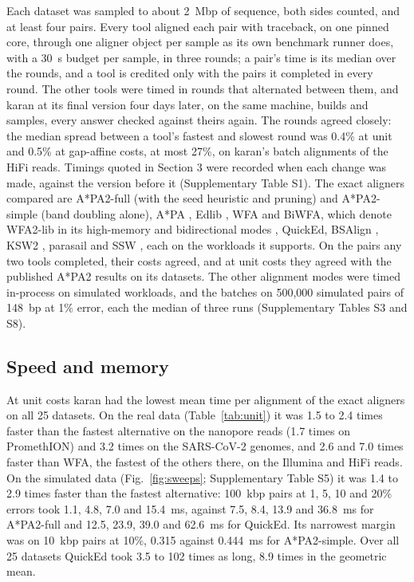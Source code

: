 Each dataset was sampled to about 2~Mbp of sequence, both sides counted, and at least four pairs. Every tool aligned each pair with traceback, on one pinned core, through one aligner object per sample as its own benchmark runner does, with a 30~s budget per sample, in three rounds; a pair's time is its median over the rounds, and a tool is credited only with the pairs it completed in every round. The other tools were timed in rounds that alternated between them, and karan at its final version four days later, on the same machine, builds and samples, every answer checked against theirs again. The rounds agreed closely: the median spread between a tool's fastest and slowest round was 0.4\% at unit and 0.5\% at gap-affine costs, at most 27\%, on karan's batch alignments of the HiFi reads. Timings quoted in Section 3 were recorded when each change was made, against the version before it (Supplementary Table S1). The exact aligners compared are A*PA2-full (with the seed heuristic and pruning) and A*PA2-simple (band doubling alone), A*PA \citep{GrootKoerkamp2024astarpa}, Edlib \citep{Sosic2017edlib}, WFA and BiWFA, which denote WFA2-lib in its high-memory and bidirectional modes \citep{MarcoSola2021wfa,MarcoSola2023biwfa}, QuickEd, BSAlign \citep{Shao2024bsalign}, KSW2 \citep{Li2018minimap2}, parasail \citep{Daily2016parasail} and SSW \citep{Zhao2013ssw}, each on the workloads it supports. On the pairs any two tools completed, their costs agreed, and at unit costs they agreed with the published A*PA2 results on its datasets. The other alignment modes were timed in-process on simulated workloads, and the batches on 500{,}000 simulated pairs of 148~bp at 1\% error, each the median of three runs (Supplementary Tables S3 and S8).

\subsection{Speed and memory}

At unit costs karan had the lowest mean time per alignment of the exact aligners on all 25 datasets. On the real data (Table~\ref{tab:unit}) it was 1.5 to 2.4 times faster than the fastest alternative on the nanopore reads (1.7 times on PromethION) and 3.2 times on the SARS-CoV-2 genomes, and 2.6 and 7.0 times faster than WFA, the fastest of the others there, on the Illumina and HiFi reads. On the simulated data (Fig.~\ref{fig:sweeps}; Supplementary Table S5) it was 1.4 to 2.9 times faster than the fastest alternative: 100~kbp pairs at 1, 5, 10 and 20\% errors took 1.1, 4.8, 7.0 and 15.4~ms, against 7.5, 8.4, 13.9 and 36.8~ms for A*PA2-full and 12.5, 23.9, 39.0 and 62.6~ms for QuickEd. Its narrowest margin was on 10~kbp pairs at 10\%, 0.315 against 0.444~ms for A*PA2-simple. Over all 25 datasets QuickEd took 3.5 to 102 times as long, 8.9 times in the geometric mean.

